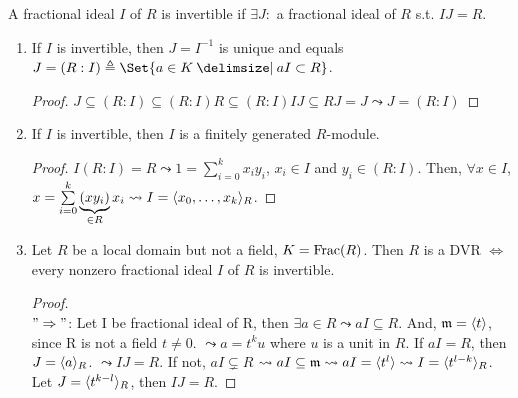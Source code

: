 \begin{definition}
  A fractional ideal $I$ of $R$ is invertible if $\exists J:$ a fractional ideal
  of $R$ s.t. $IJ = R$.
\end{definition}

\begin{prop}\mbox{}
  \begin{enumerate}
    \item If $I$ is invertible, then $J = I^{-1}$ is unique and equals
      $J = (R:I) \triangleq \Set{a \in K \given aI \subset R}$.
      \begin{proof}
        $ J \subseteq (R:I) \subseteq (R:I)R \subseteq (R:I)IJ \subseteq RJ = J
        \leadsto J = (R:I) $
      \end{proof}
    \item If $I$ is invertible, then $I$ is a finitely generated $R$-module.
      \begin{proof}
        $I(R:I) = R \leadsto 1 = \sum\limits_{i = 0}^{k} x_iy_i$, $x_i \in I$ and
        $y_i \in (R:I)$. Then, $\forall x \in I$, $x = \sum\limits_{i = 0}^{k} 
        \underbrace{(xy_i)}_{\in R}x_i \leadsto I = \langle x_0, \dots, x_k\rangle_R$.
      \end{proof}
    \item Let $R$ be a local domain but not a field, $K = \operatorname{Frac}(R)$.
      Then $R$ is a DVR $\iff$ every nonzero fractional ideal $I$ of $R$ is
      invertible.
      \begin{proof} $ $\\
        $"\Rightarrow"$:
        Let I be fractional ideal of R, then $\exists a \in R \leadsto aI 
        \subseteq R$. And, $\mathfrak{m} = \langle t\rangle$, since R is not a field $t \ne 0$.
        $\leadsto a = t^k u$ where $u$ is a unit in $R$.
        If $aI = R$, then $J = \langle a\rangle_R$. $\leadsto IJ = R$. If not,
        $aI \subsetneq R$ $\leadsto aI \subseteq \mathfrak{m} \leadsto aI = \langle t^l\rangle
        \leadsto I = \langle t^{l - k}\rangle_R$. Let $J = \langle t^{k - l}\rangle_R$, then $IJ
         = R$.


\end{proof}
\end{enumerate}
\end{prop}
